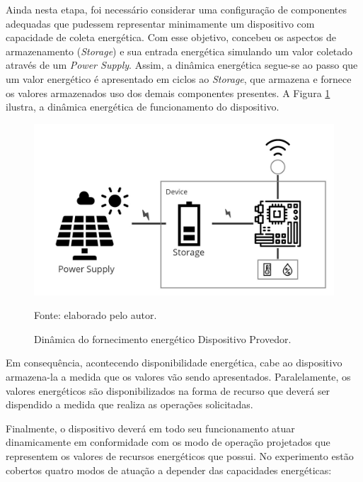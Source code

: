 Ainda nesta etapa, foi necessário considerar uma configuração de componentes adequadas que pudessem representar minimamente um dispositivo com capacidade de coleta energética. Com esse objetivo, concebeu os aspectos de armazenamento (\textit{Storage}) e sua entrada energética simulando um valor coletado através de um \textit{Power Supply}. Assim, a dinâmica energética segue-se ao passo que um valor energético é apresentado em ciclos ao \textit{Storage}, que armazena e fornece os valores armazenados uso dos demais componentes presentes. A Figura \ref{fig:cap6dinamica} ilustra, a dinâmica energética de funcionamento do dispositivo.

\begin{figure}[H]
	\centering
	
	\caption{Dinâmica do fornecimento energético Dispositivo Provedor.}
	\label{fig:cap6dinamica}
	\noindent\includegraphics[width=0.75\linewidth]{Imagens/cap6/cap6dinamica.jpg} 
		
	Fonte: elaborado pelo autor.
\end{figure}


Em consequência, acontecendo disponibilidade energética, cabe ao dispositivo armazena-la a medida que os valores vão sendo apresentados. Paralelamente, os valores energéticos são disponibilizados na forma de recurso que deverá ser dispendido a medida que realiza as operações solicitadas.

Finalmente, o dispositivo deverá em todo seu funcionamento atuar dinamicamente em conformidade com os modo de operação projetados que representem os valores de recursos energéticos que possui. No experimento estão cobertos quatro modos de atuação a depender das capacidades energéticas:

